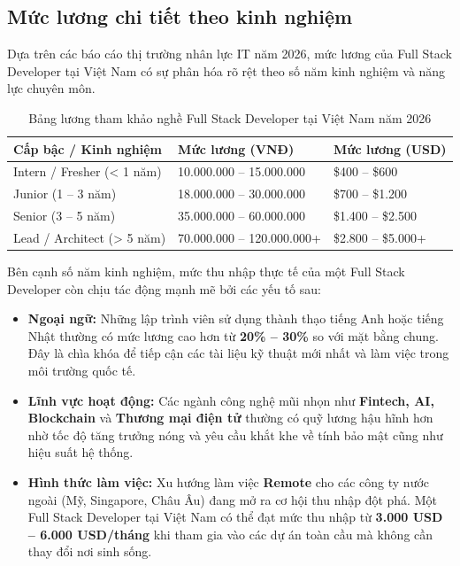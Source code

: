 \documentclass[12pt,a4paper]{article}
\begin{document}
\subsection{Mức lương chi tiết theo kinh nghiệm}

\hspace{0.7cm}Dựa trên các báo cáo thị trường nhân lực IT năm 2026, mức lương của Full Stack Developer tại Việt Nam có sự phân hóa rõ rệt theo số năm kinh nghiệm và năng lực chuyên môn.
\begin{table}[H]
\centering
\renewcommand{\arraystretch}{1.5}
\begin{tabular}{|l|l|l|}
\hline
\textbf{Cấp bậc / Kinh nghiệm} & \textbf{Mức lương (VNĐ)} & \textbf{Mức lương (USD)} \\ \hline
Intern / Fresher (< 1 năm) & 10.000.000 – 15.000.000 & \$400 – \$600 \\ \hline
Junior (1 – 3 năm) & 18.000.000 – 30.000.000 & \$700 – \$1.200 \\ \hline
Senior (3 – 5 năm) & 35.000.000 – 60.000.000 & \$1.400 – \$2.500 \\ \hline
Lead / Architect (> 5 năm) & 70.000.000 – 120.000.000+ & \$2.800 – \$5.000+ \\ \hline
\end{tabular}
\caption{Bảng lương tham khảo nghề Full Stack Developer tại Việt Nam năm 2026}
\end{table}
Bên cạnh số năm kinh nghiệm, mức thu nhập thực tế của một Full Stack Developer còn chịu tác động mạnh mẽ bởi các yếu tố sau:

\begin{itemize}
    \item \textbf{Ngoại ngữ:} Những lập trình viên sử dụng thành thạo tiếng Anh hoặc tiếng Nhật thường có mức lương cao hơn từ \textbf{20\% – 30\%} so với mặt bằng chung. Đây là chìa khóa để tiếp cận các tài liệu kỹ thuật mới nhất và làm việc trong môi trường quốc tế.
    \item \textbf{Lĩnh vực hoạt động:} Các ngành công nghệ mũi nhọn như \textbf{Fintech, AI, Blockchain} và \textbf{Thương mại điện tử} thường có quỹ lương hậu hĩnh hơn nhờ tốc độ tăng trưởng nóng và yêu cầu khắt khe về tính bảo mật cũng như hiệu suất hệ thống.
    \item \textbf{Hình thức làm việc:} Xu hướng làm việc \textbf{Remote} cho các công ty nước ngoài (Mỹ, Singapore, Châu Âu) đang mở ra cơ hội thu nhập đột phá. Một Full Stack Developer tại Việt Nam có thể đạt mức thu nhập từ \textbf{3.000 USD – 6.000 USD/tháng} khi tham gia vào các dự án toàn cầu mà không cần thay đổi nơi sinh sống.
\end{itemize}
\end{document}
